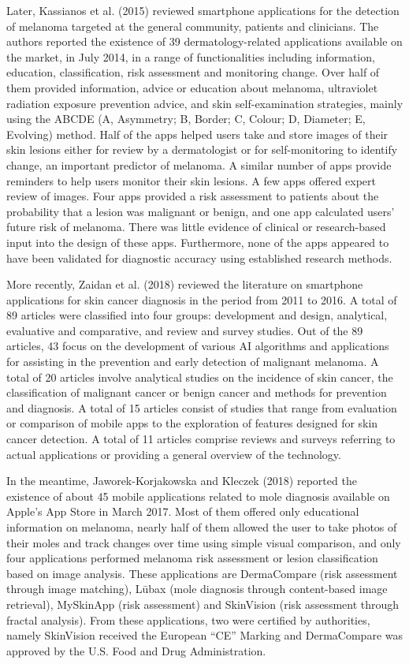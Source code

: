 Later, Kassianos et al. (2015) reviewed smartphone applications for the detection of melanoma targeted at the general community, patients and clinicians. The authors reported the existence of 39 dermatology-related applications available on the market, in July 2014, in a range of functionalities including information, education, classification, risk assessment and monitoring change. Over half of them provided information, advice or education about melanoma, ultraviolet radiation exposure prevention advice, and skin self-examination strategies, mainly using the ABCDE (A, Asymmetry; B, Border; C, Colour; D, Diameter; E, Evolving) method. Half of the apps helped users take and store images of their skin lesions either for review by a dermatologist or for self-monitoring to identify change, an important predictor of melanoma. A similar number of apps provide reminders to help users monitor their skin lesions. A few apps offered expert review of images. Four apps provided a risk assessment to patients about the probability that a lesion was malignant or benign, and one app calculated users’ future risk of melanoma. There was little evidence of clinical or research-based input into the design of these apps. Furthermore, none of the apps appeared to have been validated for diagnostic accuracy using established research methods.

More recently, Zaidan et al. (2018) reviewed the literature on smartphone applications for skin cancer diagnosis in the period from 2011 to 2016. A total of 89 articles were classified into four groups: development and design, analytical, evaluative and comparative, and review and survey studies. Out of the 89 articles, 43 focus on the development of various AI algorithms and applications for assisting in the prevention and early detection of malignant melanoma. A total of 20 articles involve analytical studies on the incidence of skin cancer, the classification of malignant cancer or benign cancer and methods for prevention and diagnosis. A total of 15 articles consist of studies that range from evaluation or comparison of mobile apps to the exploration of features designed for skin cancer detection. A total of 11 articles comprise reviews and surveys referring to actual applications or providing a general overview of the technology.

In the meantime, Jaworek-Korjakowska and Kleczek (2018) reported the existence of about 45 mobile applications related to mole diagnosis available on Apple’s App Store in March 2017. Most of them offered only educational information on melanoma, nearly half of them allowed the user to take photos of their moles and track changes over time using simple visual comparison, and only four applications performed melanoma risk assessment or lesion classification based on image analysis. These applications are DermaCompare (risk assessment through image matching), Lūbax (mole diagnosis through content-based image retrieval), MySkinApp (risk assessment) and SkinVision (risk assessment through fractal analysis). From these applications, two were certified by authorities, namely SkinVision received the European “CE” Marking and DermaCompare was approved by the U.S. Food and Drug Administration. \par

